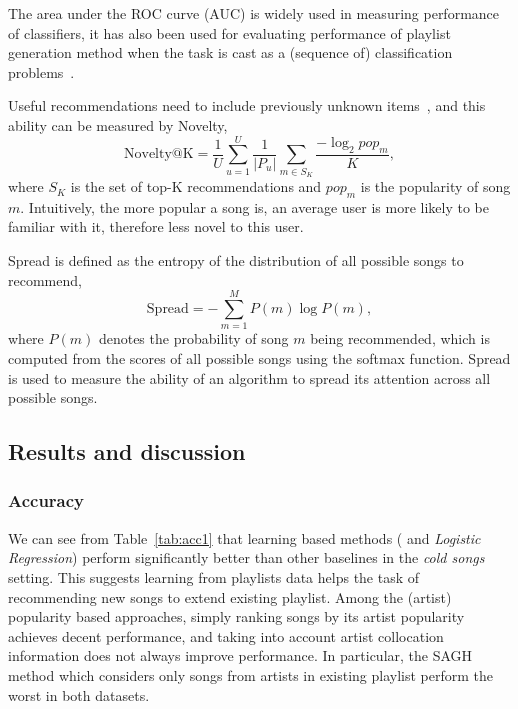 The area under the ROC curve (AUC) is widely used in measuring performance of classifiers,
it has also been used for evaluating performance of playlist generation method when the task
is cast as a (sequence of) classification problems~\cite{ben2017groove}.

Useful recommendations need to include previously unknown items~\cite{herlocker2004evaluating,zhang2012auralist}, 
and this ability can be measured by Novelty,
$$
\text{Novelty@K} = \frac{1}{U} \sum_{u=1}^U \frac{1}{|P_u|} \sum_{m \in S_K} \frac{-\log_2 pop_m}{K},
$$
where $S_K$ is the set of top-K recommendations and $pop_m$ is the popularity of song $m$.
Intuitively, the more popular a song is, an average user is more likely to be familiar with it,
therefore less novel to this user.

Spread is defined as the entropy of the distribution of all possible songs to recommend,
$$
\text{Spread} = -\sum_{m=1}^M P(m) \log P(m),
$$
where $P(m)$ denotes the probability of song $m$ being recommended,
which is computed from the scores of all possible songs using the softmax function.
Spread is used to measure the ability of an algorithm to spread its attention across all possible songs.


\subsection{Results and discussion}





\subsubsection{Accuracy}

We can see from Table~\ref{tab:acc1} that learning based methods (
and {\it Logistic Regression}) perform significantly better than other baselines in the \emph{cold songs} setting.
This suggests learning from playlists data helps the task of recommending new songs to extend existing playlist.
Among the (artist) popularity based approaches, 
simply ranking songs by its artist popularity achieves decent performance,
and taking into account artist collocation information does not always improve performance.
In particular, the SAGH method which considers only songs from artists in existing playlist
perform the worst in both datasets.

